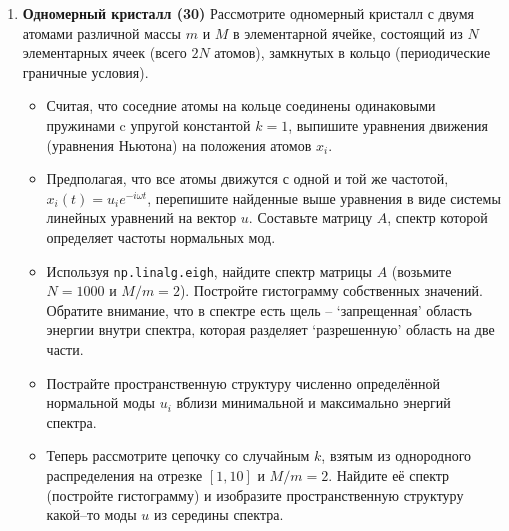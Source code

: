 \documentclass[prb,papersize=a4paper,notitlepage]{revtex4-1}%
\begin{document}
\begin{enumerate}
\item \textbf{Одномерный кристалл (30)} Рассмотрите одномерный кристалл с двумя атомами различной массы $m$ и $M$ в элементарной ячейке, состоящий из $N$ элементарных ячеек (всего $2N$ атомов), замкнутых в кольцо (периодические граничные условия).  
\begin{itemize}
\item Считая, что соседние атомы на кольце соединены одинаковыми пружинами c упругой константой $k=1$, выпишите уравнения движения (уравнения Ньютона) на положения атомов $x_i$. 
\item Предполагая, что все атомы движутся с одной и той же частотой, $x_i(t)=u_i e^{-i\omega t}$, перепишите найденные выше уравнения в виде системы линейных уравнений на вектор $u$. Составьте матрицу $A$, спектр которой определяет частоты нормальных мод.
\item Используя \lstinline{np.linalg.eigh}, найдите спектр матрицы $A$ (возьмите $N = 1000$ и $M/m = 2$). Постройте гистограмму собственных значений. Обратите внимание, что в спектре есть щель -- `запрещенная'  область энергии внутри спектра, которая разделяет `разрешенную' область на две части.
\item Пострайте пространственную структуру численно определённой нормальной моды $u_i$ вблизи минимальной и максимально энергий спектра. 
\item Теперь рассмотрите цепочку со случайным $k$, взятым из однородного распределения на отрезке $\left[1, 10\right]$ и $M/m = 2$. Найдите её спектр (постройте гистограмму) и изобразите пространственную структуру какой--то моды $u$ из середины спектра.
\end{itemize}
\end{enumerate} 
\end{document}

